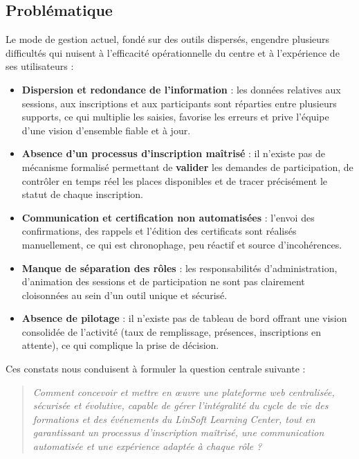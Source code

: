 \documentclass[12pt,a4paper,oneside]{report}
\begin{document}
\subsection{Problématique}
Le mode de gestion actuel, fondé sur des outils dispersés, engendre plusieurs difficultés qui
nuisent à l'efficacité opérationnelle du centre et à l'expérience de ses utilisateurs :

\begin{itemize}[leftmargin=1.2cm]
  \item \textbf{Dispersion et redondance de l'information} : les données relatives aux
  sessions, aux inscriptions et aux participants sont réparties entre plusieurs supports, ce
  qui multiplie les saisies, favorise les erreurs et prive l'équipe d'une vision d'ensemble
  fiable et à jour.
  \item \textbf{Absence d'un processus d'inscription maîtrisé} : il n'existe pas de mécanisme
  formalisé permettant de \textbf{valider} les demandes de participation, de contrôler en
  temps réel les places disponibles et de tracer précisément le statut de chaque inscription.
  \item \textbf{Communication et certification non automatisées} : l'envoi des confirmations,
  des rappels et l'édition des certificats sont réalisés manuellement, ce qui est chronophage,
  peu réactif et source d'incohérences.
  \item \textbf{Manque de séparation des rôles} : les responsabilités d'administration,
  d'animation des sessions et de participation ne sont pas clairement cloisonnées au sein d'un
  outil unique et sécurisé.
  \item \textbf{Absence de pilotage} : il n'existe pas de tableau de bord offrant une vision
  consolidée de l'activité (taux de remplissage, présences, inscriptions en attente), ce qui
  complique la prise de décision.
\end{itemize}

Ces constats nous conduisent à formuler la question centrale suivante :

\begin{quote}\itshape
Comment concevoir et mettre en œuvre une plateforme web centralisée, sécurisée et évolutive,
capable de gérer l'intégralité du cycle de vie des formations et des événements du LinSoft
Learning Center, tout en garantissant un processus d'inscription maîtrisé, une communication
automatisée et une expérience adaptée à chaque rôle ?
\end{quote}
\end{document}
